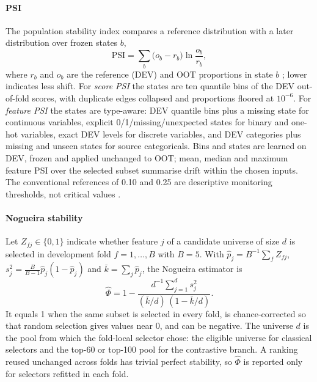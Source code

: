 \documentclass[final,5p,twocolumn]{elsarticle}
\newcommand{\PSI}{\mathrm{PSI}}
\begin{document}
\paragraph{PSI}
The population stability index compares a reference distribution with a later distribution over frozen states $b$,
\begin{equation}
    \PSI=\sum_{b}\big(o_b-r_b\big)\ln\frac{o_b}{r_b},
    \label{eq:psi}
\end{equation}
where $r_b$ and $o_b$ are the reference (DEV) and OOT proportions in state $b$ \cite{siddiqi2006,yurdakul2020}; lower indicates less shift. For \emph{score PSI} the states are ten quantile bins of the DEV out-of-fold scores, with duplicate edges collapsed and proportions floored at $10^{-6}$. For \emph{feature PSI} the states are type-aware: DEV quantile bins plus a missing state for continuous variables, explicit 0/1/missing/unexpected states for binary and one-hot variables, exact DEV levels for discrete variables, and DEV categories plus missing and unseen states for source categoricals. Bins and states are learned on DEV, frozen and applied unchanged to OOT; mean, median and maximum feature PSI over the selected subset summarise drift within the chosen inputs. The conventional references of 0.10 and 0.25 are descriptive monitoring thresholds, not critical values \cite{yurdakul2020}.

\paragraph{Nogueira stability}
Let $Z_{fj}\in\{0,1\}$ indicate whether feature $j$ of a candidate universe of size $d$ is selected in development fold $f=1,\dots,B$ with $B=5$. With $\hat p_j=B^{-1}\sum_f Z_{fj}$, $s_j^2=\frac{B}{B-1}\hat p_j(1-\hat p_j)$ and $\bar k=\sum_j \hat p_j$, the Nogueira estimator is \cite{nogueira2018}
\begin{equation}
    \hat\Phi=1-\frac{d^{-1}\sum_{j=1}^{d}s_j^2}{(\bar k/d)\,(1-\bar k/d)} .
    \label{eq:nogueira}
\end{equation}
It equals 1 when the same subset is selected in every fold, is chance-corrected so that random selection gives values near 0, and can be negative. The universe $d$ is the pool from which the fold-local selector chose: the eligible universe for classical selectors and the top-60 or top-100 pool for the contrastive branch. A ranking reused unchanged across folds has trivial perfect stability, so $\hat\Phi$ is reported only for selectors refitted in each fold.
\end{document}
